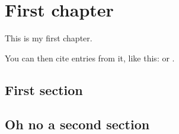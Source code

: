 \chapter{First chapter}
This is my first chapter.

You can then cite entries from it, like this: \textcite{greenwade93} or \parencite{greenwade93}.

\section{First section}
\section{Oh no a second section}